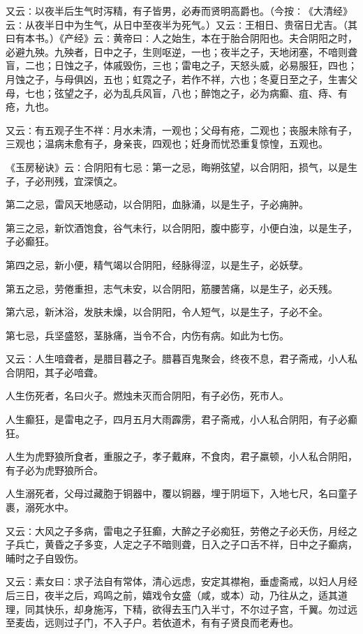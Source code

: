 \documentclass[a4paper,12pt,UTF8,twoside]{ctexbook}
\begin{document}
又云∶以夜半后生气时泻精，有子皆男，必寿而贤明高爵也。（今按∶《大清经》云∶从夜半日中为生气，从日中至夜半为死气。）又云∶王相日、贵宿日尤吉。（其曰有本书。）《产经》云∶黄帝曰∶人之始生，本在于胎合阴阳也。夫合阴阳之时，必避九殃。九殃者，日中之子，生则呕逆，一也；夜半之子，天地闭塞，不喑则聋盲，二也；日蚀之子，体戚毁伤，三也；雷电之子，天怒头威，必易服狂，四也；月蚀之子，与母俱凶，五也；虹霓之子，若作不祥，六也；冬夏日至之子，生害父母，七也；弦望之子，必为乱兵风盲，八也；醉饱之子，必为病癫、疽、痔、有疮，九也。

又云∶有五观子生不祥∶月水未清，一观也；父母有疮，二观也；丧服未除有子，三观也；温病未愈有子，身亲丧，四观也；妊身而忧恐重复惊惶，五观也。

《玉房秘诀》云∶合阴阳有七忌∶第一之忌，晦朔弦望，以合阴阳，损气，以是生子，子必刑残，宜深慎之。

第二之忌，雷风天地感动，以合阴阳，血脉涌，以是生子，子必痈肿。

第三之忌，新饮酒饱食，谷气未行，以合阴阳，腹中膨亨，小便白浊，以是生子，子必癫狂。

第四之忌，新小便，精气竭以合阴阳，经脉得涩，以是生子，必妖孽。

第五之忌，劳倦重担，志气未安，以合阴阳，筋腰苦痛，以是生子，必夭残。

第六忌，新沐浴，发肤未燥，以合阴阳，令人短气，以是生子，子必不全。

第七忌，兵坚盛怒，茎脉痛，当令不合，内伤有病。如此为七伤。

又云∶人生喑聋者，是腊目暮之子。腊暮百鬼聚会，终夜不息，君子斋戒，小人私合阴阳，其子必喑聋。

人生伤死者，名曰火子。燃烛未灭而合阴阳，有子必伤，死市人。

人生癫狂，是雷电之子，四月五月大雨霹雳，君子斋戒，小人私合阴阳，有子必癫狂。

人生为虎野狼所食者，重服之子，孝子戴麻，不食肉，君子羸顿，小人私合阴阳，有子必为虎野狼所合。

人生溺死者，父母过藏胞于铜器中，覆以铜器，埋于阴垣下，入地七尺，名曰童子裹，溺死水中。

又云∶大风之子多病，雷电之子狂癫，大醉之子必痴狂，劳倦之子必夭伤，月经之子兵亡，黄昏之子多变，人定之子不暗则聋，日入之子口舌不祥，日中之子癫病，晡时之子自毁伤。

又云∶素女曰∶求子法自有常体，清心远虑，安定其襟袍，垂虚斋戒，以妇人月经后三日，夜半之后，鸡鸣之前，嬉戏令女盛（咸，或本）动，乃往从之，适其道理，同其快乐，却身施泻，下精，欲得去玉门入半寸，不尔过子宫，千翼。勿过远至麦齿，远则过子门，不入子户。若依道术，有有子贤良而老寿也。
\end{document}
